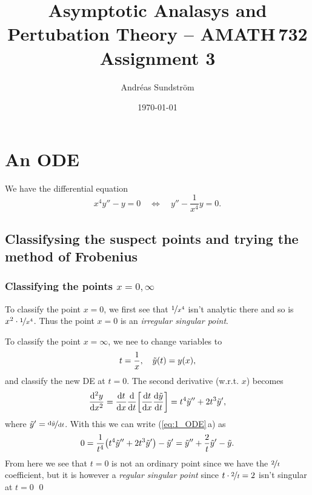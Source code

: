 \documentclass[11pt,letter, swedish, english
]{article}
\begin{document}
\title{Asymptotic Analasys and Pertubation Theory -- AMATH\,732 \\
Assignment 3}
\author{Andréas Sundström}
\date{\today}

\maketitle



\section{An ODE}
We have the differential equation
\begin{equation}\label{eq:1_ODE}
x^4y''-y=0
\quad\Longleftrightarrow\quad
y''-\frac{1}{x^4}y = 0.
\end{equation}

\subsection{Classifysing the suspect points 
  and trying the method of Frobenius} 

\subsubsection{Classifying the points $x=0, \infty$}
To classify the point $x=0$, we first see that $\nicefrac{1}{x^4}$
isn't analytic there and so is $x^2\cdot\nicefrac{1}{x^4}$. Thus the
point $x=0$ is an \emph{irregular singular point}.

To classify the point $x=\infty$, we nee to change variables to
\begin{equation}\label{eq:t_x}
t=\frac{1}{x}\qcomma \tilde{y}(t)=y(x),
\end{equation}
and classify the new DE at $t=0$.
The second derivative (w.r.t. $x$) becomes
\begin{equation}
\dv[2]{y}{x}=\dv{t}{x}
\dv{t}\qty[\dv{t}{x}\dv{\tilde{y}}{t}]=t^4\tilde{y}''+2t^3\tilde{y}',
\end{equation}
where $\tilde{y}'=\nicefrac{\mathrm{d}\tilde{y}}{\mathrm{d}{t}}$. With this we can
write (\ref{eq:1_ODE}\,a) as
\begin{equation}\label{eq:1_new_ODE}
0=\frac{1}{t^4}\qty(t^4\tilde{y}''+2t^3\tilde{y}') - \tilde{y} '
= \tilde{y}'' +\frac{2}{t}\tilde{y}' - \tilde{y}.
\end{equation}
From here we see that $t=0$ is not an ordinary point since we have the
$\nicefrac{2}{t}$ coefficient, but it is however a \emph{regular singular
point} since $t\cdot\nicefrac{2}{t}=2$ isn't singular at $t=0$
\qed
\end{document}
